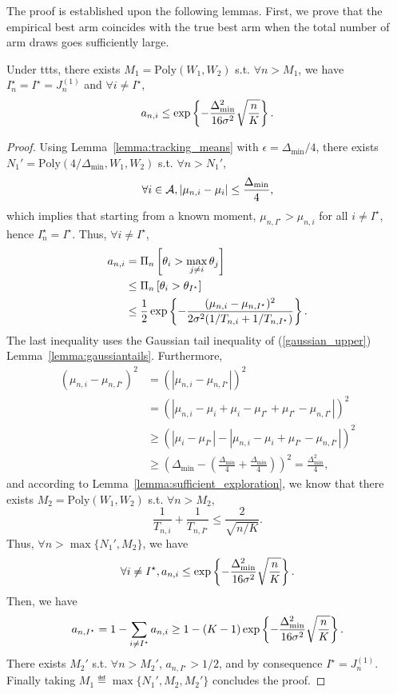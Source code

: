 The proof is established upon the following lemmas. First, we prove that the empirical best arm coincides with the true best arm when the total number of arm draws goes sufficiently large.

\begin{lemma}\label{lemma:empirical_best}
    Under \gls{ttts}, there exists $M_1 = \text{Poly}(W_1,W_2)$ s.t. $\forall n > M_1$, we have $I_n^\star = I^\star = J_n^{(1)}$ and $\forall i \neq I^\star$,
    \[
        a_{n,i} \leq \exp\left\{-\frac{\Delta_{\text{min}}^2}{16\sigma^2}\sqrt{\frac{n}{K}}\right\}.
    \]
\end{lemma}

\begin{proof}
    Using Lemma~\ref{lemma:tracking_means} with $\epsilon = \Delta_{\min}/4$, there exists $N_1' = \text{Poly}(4/\Delta_{\min},W_1,W_2)$ s.t. $\forall n > N_1'$,
    \[
        \forall i\in\mathcal{A}, |\mu_{n,i} - \mu_i| \leq \frac{\Delta_{\min}}{4}, 
    \]
    which implies that starting from a known moment, $\mu_{n,I^\star} > \mu_{n,i}$ for all $i\neq I^\star$, hence $I_n^\star = I^\star$. Thus, $\forall i \neq I^\star$,
    \begin{align*}
        a_{n,i} &= \Pi_{n}\left[\theta_i > \max_{j\neq i} \theta_j\right]\\
                             &\leq \Pi_{n}\left[\theta_i > \theta_{I^\star}\right]\\
                             &\leq \frac{1}{2}\exp\left\{-\frac{(\mu_{n,i}-\mu_{n,I^\star})^2}{2\sigma^2(1/T_{n,i}+1/T_{n,I^\star})}\right\}.
    \end{align*}
    The last inequality uses the Gaussian tail inequality of (\ref{gaussian_upper}) Lemma~\ref{lemma:gaussiantails}. Furthermore,
    \begin{align*}
        (\mu_{n,i} - \mu_{n,I^\star})^2 &= (|\mu_{n,i} - \mu_{n,I^\star}|)^2\\
                                        &= (|\mu_{n,i} - \mu_i + \mu_i - \mu_{I^\star} + \mu_{I^\star} -\mu_{n,I^\star}|)^2\\
                                        &\geq (|\mu_i - \mu_{I^\star}| - |\mu_{n,i} - \mu_i + \mu_{I^\star} -\mu_{n,I^\star}|)^2\\
                                        &\geq \left(\Delta_{\text{min}} - \left(\frac{\Delta_{\text{min}}}{4} + \frac{\Delta_{\text{min}}}{4}\right)\right)^2 = \frac{\Delta_{\text{min}}^2}{4},
    \end{align*}
    and according to Lemma~\ref{lemma:sufficient_exploration}, we know that there exists $M_2 = \text{Poly}(W_1,W_2)$ s.t. $\forall n > M_2$,
    \[
        \frac{1}{T_{n,i}}+\frac{1}{T_{n,I^\star}} \leq \frac{2}{\sqrt{n/K}}.
    \]
    Thus, $\forall n > \max\{N_1',M_2\}$, we have
    \[
        \forall i\neq I^\star, a_{n,i} \leq \exp\left\{-\frac{\Delta_{\text{min}}^2}{16\sigma^2}\sqrt{\frac{n}{K}}\right\}.
    \]
    Then, we have
    \[
        a_{n,I^\star} = 1 - \sum_{i\neq I^\star} a_{n,i} \geq 1-(K-1)\exp\left\{-\frac{\Delta_{\text{min}}^2}{16\sigma^2}\sqrt{\frac{n}{K}}\right\}.
    \]
    There exists $M_2'$ s.t. $\forall n > M_2'$, $a_{n,I^\star}>1/2$, and by consequence $I^\star = J_n^{(1)}$. Finally taking $M_1 \eqdef \max\{N_1', M_2, M_2'\}$ concludes the proof.
\end{proof}

